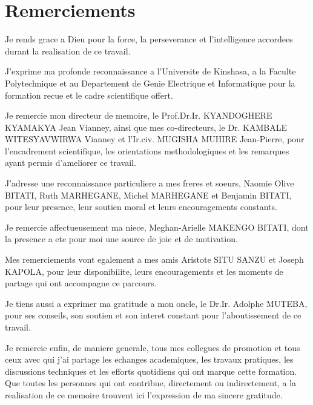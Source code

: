 \chapter*{Remerciements}

Je rends grace a Dieu pour la force, la perseverance et l'intelligence accordees durant la realisation de ce travail.

J'exprime ma profonde reconnaissance a l'Universite de Kinshasa, a la Faculte Polytechnique et au Departement de Genie Electrique et Informatique pour la formation recue et le cadre scientifique offert.

Je remercie mon directeur de memoire, le Prof.Dr.Ir. KYANDOGHERE KYAMAKYA Jean Vianney, ainsi que mes co-directeurs, le Dr. KAMBALE WITESYAVWIRWA Vianney et l'Ir.civ. MUGISHA MUHIRE Jean-Pierre, pour l'encadrement scientifique, les orientations methodologiques et les remarques ayant permis d'ameliorer ce travail.

J'adresse une reconnaissance particuliere a mes freres et soeurs, Naomie Olive BITATI, Ruth MARHEGANE, Michel MARHEGANE et Benjamin BITATI, pour leur presence, leur soutien moral et leurs encouragements constants.

Je remercie affectueusement ma niece, Meghan-Arielle MAKENGO BITATI, dont la presence a ete pour moi une source de joie et de motivation.

Mes remerciements vont egalement a mes amis Aristote SITU SANZU et Joseph KAPOLA, pour leur disponibilite, leurs encouragements et les moments de partage qui ont accompagne ce parcours.

Je tiens aussi a exprimer ma gratitude a mon oncle, le Dr.Ir. Adolphe MUTEBA, pour ses conseils, son soutien et son interet constant pour l'aboutissement de ce travail.

Je remercie enfin, de maniere generale, tous mes collegues de promotion et tous ceux avec qui j'ai partage les echanges academiques, les travaux pratiques, les discussions techniques et les efforts quotidiens qui ont marque cette formation. Que toutes les personnes qui ont contribue, directement ou indirectement, a la realisation de ce memoire trouvent ici l'expression de ma sincere gratitude.
